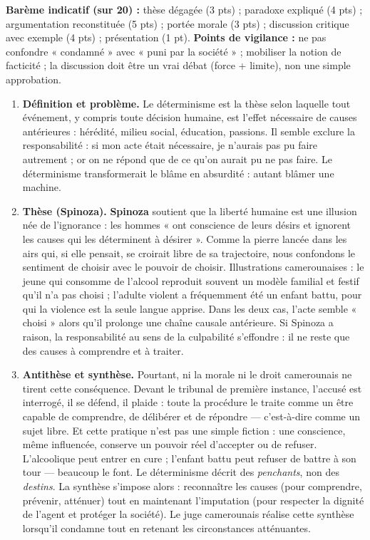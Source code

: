 \documentclass[11pt]{article}
\newcommand{\cle}[1]{{\popxbold\color{popdark}#1}}
\begin{document}
\begin{corrige}
\begin{enumerate}
\end{enumerate}
\textbf{Barème indicatif (sur 20) :} thèse dégagée (3 pts) ; paradoxe expliqué (4 pts) ; argumentation reconstituée (5 pts) ; portée morale (3 pts) ; discussion critique avec exemple (4 pts) ; présentation (1 pt).
\textbf{Points de vigilance :} ne pas confondre « condamné » avec « puni par la société » ; mobiliser la notion de facticité ; la discussion doit être un vrai débat (force + limite), non une simple approbation.
\end{corrige}

\begin{corrige}
\begin{enumerate}
\item \textbf{Définition et problème.} Le \cle{déterminisme} est la thèse selon laquelle tout événement, y compris toute décision humaine, est l'effet nécessaire de causes antérieures : hérédité, milieu social, éducation, passions. Il semble exclure la responsabilité : si mon acte était nécessaire, je n'aurais pas pu faire autrement ; or on ne répond que de ce qu'on aurait pu ne pas faire. Le déterminisme transformerait le blâme en absurdité : autant blâmer une machine.
\item \textbf{Thèse (Spinoza).} \textbf{Spinoza} soutient que la liberté humaine est une illusion née de l'ignorance : les hommes « ont conscience de leurs désirs et ignorent les causes qui les déterminent à désirer ». Comme la pierre lancée dans les airs qui, si elle pensait, se croirait libre de sa trajectoire, nous confondons le sentiment de choisir avec le pouvoir de choisir. Illustrations camerounaises : le jeune qui consomme de l'alcool reproduit souvent un modèle familial et festif qu'il n'a pas choisi ; l'adulte violent a fréquemment été un enfant battu, pour qui la violence est la seule langue apprise. Dans les deux cas, l'acte semble « choisi » alors qu'il prolonge une chaîne causale antérieure. Si Spinoza a raison, la responsabilité au sens de la culpabilité s'effondre : il ne reste que des causes à comprendre et à traiter.
\item \textbf{Antithèse et synthèse.} Pourtant, ni la morale ni le droit camerounais ne tirent cette conséquence. Devant le tribunal de première instance, l'accusé est interrogé, il se défend, il plaide : toute la procédure le traite comme un être capable de comprendre, de délibérer et de répondre — c'est-à-dire comme un sujet libre. Et cette pratique n'est pas une simple fiction : une conscience, même influencée, conserve un pouvoir réel d'accepter ou de refuser. L'alcoolique peut entrer en cure ; l'enfant battu peut refuser de battre à son tour — beaucoup le font. Le déterminisme décrit des \emph{penchants}, non des \emph{destins}. La synthèse s'impose alors : reconnaître les causes (pour comprendre, prévenir, atténuer) tout en maintenant l'imputation (pour respecter la dignité de l'agent et protéger la société). Le juge camerounais réalise cette synthèse lorsqu'il condamne tout en retenant les circonstances atténuantes.

\end{enumerate}
\end{corrige}
\end{document}
